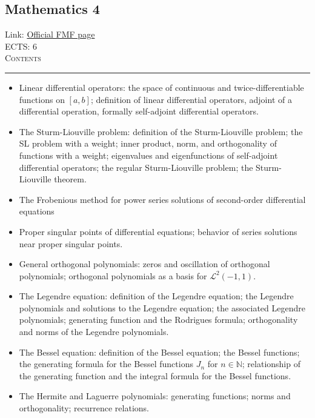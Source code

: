 \documentclass[11pt, a4paper]{article}
\newenvironment{course}[3]{
\subsection{#1}%
Link: \href{#2}{Official FMF page}\\%
ECTS: #3%
\vspace{1ex}
\\
{\large \textsc{Contents}}\\[-0.9ex]%
\rule{\textwidth}{0.5pt}
\vspace{-3ex}
}
{}
\newenvironment{chapter}[1]{
\begin{tcolorbox}[title=#1, breakable]
}
{\end{tcolorbox}}
\begin{document}
\begin{course}{Mathematics 4}{https://www.fmf.uni-lj.si/en/study-physics/programmes/1fiz/2020/7000777/courses/523/}{6}
\begin{chapter}{Sturm-Liouville theory and second-order homogeneous LDEs}
\begin{itemize}
            \item Linear differential operators: the space of continuous and twice-differentiable functions on $ [a, b] $; definition of linear differential operators, adjoint of a differential operation, formally self-adjoint differential operators.

            \item The Sturm-Liouville problem: definition of the Sturm-Liouville problem; the SL problem with a weight; inner product, norm, and orthogonality of functions with a weight; eigenvalues and eigenfunctions of self-adjoint differential operators; the regular Sturm-Liouville problem; the Sturm-Liouville theorem.
        
        \end{itemize}
        
    \end{chapter}

    \begin{chapter}{Power series solutions of second-order DEs}

        \begin{itemize}
        
            \item The Frobenious method for power series solutions of second-order differential equations

            \item Proper singular points of differential equations; behavior of series solutions near proper singular points.

            \item General orthogonal polynomials: zeros and oscillation of orthogonal polynomials; orthogonal polynomials as a basis for $ \mathcal{L}^{2}(-1, 1) $.

            \item The Legendre equation: definition of the Legendre equation; the Legendre polynomials and solutions to the Legendre equation; the associated Legendre polynomials; generating function and the Rodrigues formula; orthogonality and norms of the Legendre polynomials.

            \item The Bessel equation: definition of the Bessel equation; the Bessel functions; the generating formula for the Bessel functions $ J_{n} $ for $ n \in \mathbb{N} $; relationship of the generating function and the integral formula for the Bessel functions.

            \item The Hermite and Laguerre polynomials: generating functions; norms and orthogonality; recurrence relations.
        
        \end{itemize}
        
    \end{chapter}

\end{course}
\end{document}
